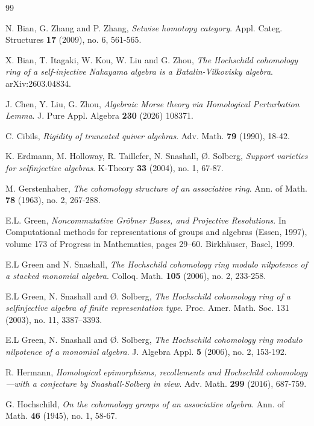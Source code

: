 \documentclass[10pt, reqno]{amsart}
\theoremstyle{definition}
\theoremstyle{remark}
\numberwithin{equation}{section}
\begin{document}

\begin{thebibliography}{99}


 N. Bian, G. Zhang and P. Zhang,
\emph{Setwise homotopy category}.
Appl. Categ. Structures \textbf{17} (2009), no. 6, 561-565.

 X. Bian, T. Itagaki, W. Kou, W. Liu and G. Zhou,
\emph{The Hochschild cohomology ring of a self-injective Nakayama algebra is a Batalin-Vilkovisky algebra}. arXiv:2603.04834.


 J. Chen, Y. Liu, G. Zhou,  \emph{Algebraic Morse theory via Homological Perturbation Lemma}.   J. Pure Appl. Algebra    \textbf{230} (2026) 108371.


 C. Cibils, \emph{Rigidity of truncated quiver algebras}. Adv. Math. \textbf{79} (1990), 18-42. 

    K. Erdmann,   M. Holloway,  R. Taillefer,  N. Snashall, {\O}. Solberg, \emph{Support varieties for selfinjective algebras}. K-Theory \textbf{33} (2004), no. 1, 67-87.


 M. Gerstenhaber,
\emph{The cohomology structure of an associative ring}.
Ann. of Math. \textbf{78} (1963), no. 2, 267-288.

 E.L. Green, \emph{Noncommutative Gröbner Bases, and Projective Resolutions}. In Computational methods for representations of groups and algebras (Essen, 1997), volume 173 of Progress in Mathematics, pages 29–60. Birkhäuser, Basel, 1999.

 E.L Green and N. Snashall, \emph{The Hochschild cohomology ring modulo nilpotence of a stacked monomial algebra}. Colloq. Math.  \textbf{105}  (2006),  no. 2, 233-258.

 E.L Green, N. Snashall and  {\O}. Solberg, \emph{The Hochschild cohomology ring of a selfinjective algebra of finite representation type}. Proc. Amer. Math. Soc.  131  (2003),  no. 11, 3387–3393.

 E.L Green, N. Snashall and  {\O}. Solberg, \emph{The Hochschild cohomology ring modulo nilpotence of a monomial algebra}. J. Algebra Appl.  \textbf{5}  (2006),  no. 2, 153-192.


 R. Hermann, \emph{Homological epimorphisms, recollements and Hochschild cohomology—with a conjecture by Snashall-Solberg in view}. Adv. Math.  \textbf{299}  (2016), 687-759.

 G. Hochschild,
\emph{On the cohomology groups of an associative algebra}.
Ann. of Math. \textbf{46} (1945), no. 1, 58-67.


\end{thebibliography}
\end{document}
